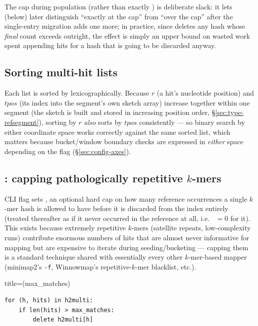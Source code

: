 The  cap during population (rather than exactly ) is
deliberate slack: it lets  (below) later distinguish ``exactly at the
cap'' from ``over the cap'' after the single-entry migration adds one more; in practice, since
 deletes any hash whose \emph{final} count exceeds 
outright, the effect is simply an upper bound on wasted work spent appending hits for a hash that
is going to be discarded anyway.

\subsection{Sorting multi-hit lists}
\label{sec:index-sort}

Each  list is sorted by  lexicographically. Because $r$ (a
hit's nucleotide position) and $\mathit{tpos}$ (its index into the segment's own sketch array)
increase together within one segment (the sketch is built and stored in increasing position
order, \S\ref{sec:type-refsegment}), sorting by $r$ \emph{also} sorts by $\mathit{tpos}$
consistently --- so binary search by either coordinate space works correctly against the same
sorted list, which matters because bucket/window boundary checks are expressed in \emph{either}
space depending on the  flag (\S\ref{sec:config-axes}).

\subsection{: capping pathologically repetitive $k$-mers}
\label{sec:max-matches}

CLI flag  sets , an optional hard cap on how many reference
occurrences a single $k$-mer hash is allowed to have before it is discarded from the index
entirely (treated thereafter as if it never occurred in the reference at all, i.e.\
 $=0$ for it). This exists because extremely repetitive $k$-mers (satellite
repeats, low-complexity runs) contribute enormous numbers of hits that are almost never
informative for mapping but are expensive to iterate during seeding/bucketing --- capping them is
a standard technique shared with essentially every other $k$-mer-based mapper (minimap2's
\texttt{-f}, Winnowmap's repetitive-$k$-mer blacklist, etc.).

\begin{algobox}{title={(max\_matches)}}
\begin{verbatim}
for (h, hits) in h2multi:
    if len(hits) > max_matches:
        delete h2multi[h]
\end{verbatim}
\end{algobox}

